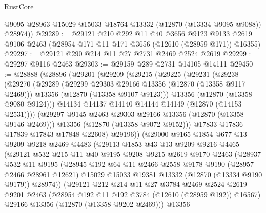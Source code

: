 \begin{lexlean}{RustCore}
\begin{coremodule}
        @9095
        @28963
        @15029
        @15033
        @18764
        @13332
        (@12870 (@13334 @9095 @9088))
        @28974))
@29289 := @29121
    @210
    @292
    @11
    @40
    @3656
    @9123
    @9133
    @2619
    @9106
    @2463
    (@28954 @171 @11 @171 @3656 (@12610 (@28959 @171)) @16355)
@29297 := @29121 @290 @214 @11 @27 @2731 @2469 @2524 @2619
@29299 := @29297 @9116 @2463
@29303 := @29159 @289 @2731 @14105 @14111
@29450 := @28888
    (@28896
      (@29201
        (@29209
          (@29215
            (@29225
              (@29231
                (@29238
                  (@29270
                    (@29289
                      (@29299 @29303 @29166 @13356 (@12870 (@13358 @9117 @2469)))
                      @13356
                      (@12870 (@13358 @9107 @9123)))
                    @13356
                    (@12870 (@13358 @9080 @9124)))
                  @14134
                  @14137
                  @14140
                  @14144
                  @14149
                  (@12870 (@14153 @2531))))
              (@29297 @9145 @2463 @29303 @29166 @13356 (@12870 (@13358 @9146 @2469)))
              @13356
              (@12870 (@13358 @9072 @9152)))
            @17833
            @17836
            @17839
            @17843
            @17848
            @22608)
          @29196))
      (@29000
        @9165
        @1854
        @677
        @13
        @9209
        @9218
        @2469
        @4483
        (@29113
          @1853
          @43
          @13
          @9209
          @9216
          @4465
          (@29121
            @532
            @215
            @11
            @40
            @9195
            @9208
            @9215
            @2619
            @9170
            @2463
            (@28937
              @532
              @11
              @9195
              (@28945
                @192
                @64
                @11
                @2466
                @2558
                @9178
                @9190
                (@28957 @2466 @28961 @12621)
                @15029
                @15033
                @19381
                @13332
                (@12870 (@13334 @9190 @9179))
                @28974))
            (@29121
              @212
              @214
              @11
              @27
              @3784
              @2469
              @2524
              @2619
              @9201
              @2463
              (@28954 @192 @11 @192 @3784 (@12610 (@28959 @192)) @16567)
              @29166
              @13356
              (@12870 (@13358 @9202 @2469)))
            @13356

\end{coremodule}
\end{lexlean}
